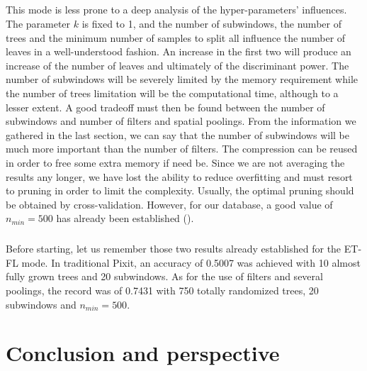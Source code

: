 \documentclass[a4paper]{report}
\begin{document}
	\paragraph{}
	This mode is less prone to a deep analysis of the hyper-parameters' influences. The parameter $k$ is fixed to 1, and the number of subwindows, the number of trees and the minimum number of samples to split all influence the number of leaves in a well-understood fashion. An increase in the first two will produce an increase of the number of leaves and ultimately of the discriminant power. The number of subwindows will be severely limited by the memory requirement while the number of trees limitation will be the computational time, although to a lesser extent. A good tradeoff must then be found between the number of subwindows and number of filters and spatial poolings. From the information we gathered in the last section, we can say that the number of subwindows will be much more important than the number of filters. The compression can be reused in order to free some extra memory if need be.
	Since we are not averaging the results any longer, we have lost the ability to reduce overfitting and must resort to pruning in order to limit the complexity. Usually, the optimal pruning should be obtained by cross-validation. However, for our database, a good value of $n_{min} = 500$ has already been established (\cite{base}). 
	\paragraph{}
	Before starting, let us remember those two results already established for the ET-FL mode. In traditional Pixit, an accuracy of 0.5007 was achieved with 10 almost fully grown trees and 20 subwindows. As for the use of filters and several poolings, the record was of 0.7431 with 750 totally randomized trees, 20 subwindows and $n_{min} = 500$. 
	
	
	
	
	
	
\chapter{Conclusion and perspective}

 


  
\end{document}
